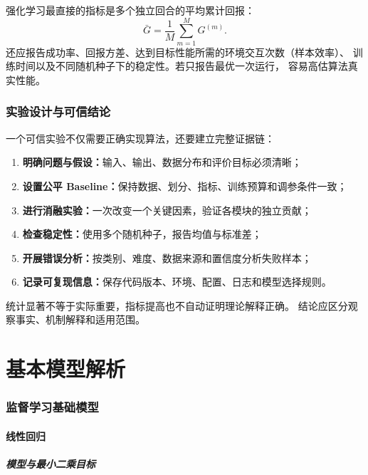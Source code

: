 \documentclass[UTF8,zihao=-4,a4paper,fontset=windows]{ctexart}
\begin{document}
强化学习最直接的指标是多个独立回合的平均累计回报：
\begin{equation}
  \bar G=\frac{1}{M}\sum_{m=1}^{M}G^{(m)}.
\end{equation}
还应报告成功率、回报方差、达到目标性能所需的环境交互次数（样本效率）、
训练时间以及不同随机种子下的稳定性。若只报告最优一次运行，
容易高估算法真实性能。

\section{实验设计与可信结论}

一个可信实验不仅需要正确实现算法，还要建立完整证据链\cite{bishop,hastie}：
\begin{enumerate}
  \item \textbf{明确问题与假设：}输入、输出、数据分布和评价目标必须清晰；
  \item \textbf{设置公平 Baseline：}保持数据、划分、指标、训练预算和调参条件一致；
  \item \textbf{进行消融实验：}一次改变一个关键因素，验证各模块的独立贡献；
  \item \textbf{检查稳定性：}使用多个随机种子，报告均值与标准差；
  \item \textbf{开展错误分析：}按类别、难度、数据来源和置信度分析失败样本；
  \item \textbf{记录可复现信息：}保存代码版本、环境、配置、日志和模型选择规则。
\end{enumerate}
统计显著不等于实际重要，指标提高也不自动证明理论解释正确。
结论应区分观察事实、机制解释和适用范围。

\part{基本模型解析}

\section{监督学习基础模型}

\subsection{线性回归}

\subsubsection{模型与最小二乘目标}
\end{document}
